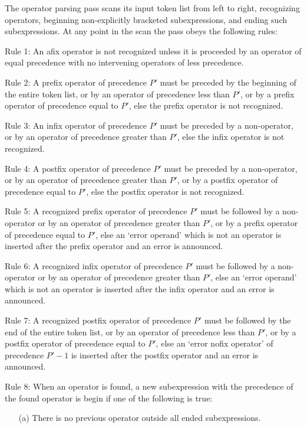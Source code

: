 \documentclass[12pt]{article}
\newenvironment{itemlist}[1][1.2in]%
	{\begin{list}{}{\setlength{\labelwidth}{#1}%
		        \setlength{\leftmargin}{\labelwidth}%
		        \addtolength{\leftmargin}{+0.2in}%
		        \renewcommand{\makelabel}[1]{##1\hfill}}}%
	{\end{list}}
\begin{document}
The operator parsing pass scans its input token list from
left to right, recognizing operators, beginning non-explicitly
bracketed subexpressions, and ending such subexpressions.
At any point in the scan the pass obeys the
following rules:
\begin{itemlist}[0.7in]
\item[Rule 1:] An afix operator is not recognized unless it
is proceeded by an operator of equal precedence with no
intervening operators of less precedence.
\item[Rule 2:] A prefix operator of precedence $P'$
must be preceded by the beginning of
the entire token list, or by an operator
of precedence less than $P'$,
or by a prefix operator of precedence equal to $P'$,
else the prefix operator is not recognized.
\item[Rule 3:] An infix operator of precedence $P'$
must be preceded by a non-operator,
or by an operator of precedence greater than $P'$,
else the infix operator is not recognized.
\item[Rule 4:] A postfix operator of precedence $P'$
must be preceded by a non-operator,
or by an operator of precedence greater than $P'$,
or by a postfix operator of precedence equal to $P'$,
else the postfix operator is not recognized.
\item[Rule 5:] A recognized prefix operator of precedence $P'$
must be followed by a non-operator or by an operator
of precedence greater than $P'$,
or by a prefix operator of precedence equal to $P'$,
else an `error operand' which is not an operator
is inserted after the prefix operator
and an error is announced.
\item[Rule 6:] A recognized infix operator of precedence $P'$
must be followed by a non-operator or by an operator
of precedence greater than $P'$,
else an `error operand' which is not an operator
is inserted after the infix operator
and an error is announced.
\item[Rule 7:] A recognized postfix operator of precedence $P'$
must be followed by the end of the entire token list,
or by an operator of precedence less than $P'$,
or by a postfix operator of precedence equal to $P'$,
else an `error nofix operator' of precedence $P'-1$
is inserted after the postfix operator and an error is announced.
\item[Rule 8:] When an operator is found, a new subexpression
with the precedence of the found operator is begin if one of
the following is true:
\begin{itemize}
\item[(a)] There is no previous operator outside all ended subexpressions.

\end{itemize}
\end{itemlist}
\end{document}
